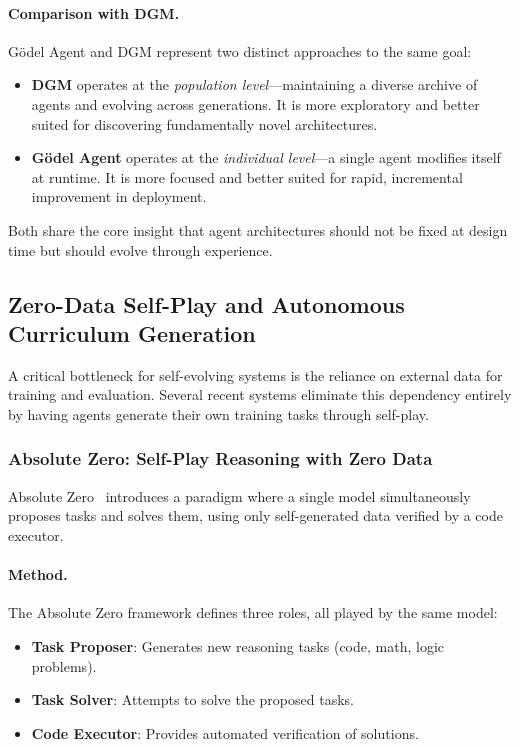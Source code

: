 \paragraph{Comparison with DGM.}
G\"odel Agent and DGM represent two distinct approaches to the same goal:
\begin{itemize}
    \item \textbf{DGM} operates at the \emph{population level}---maintaining a diverse archive of agents and evolving across generations. It is more exploratory and better suited for discovering fundamentally novel architectures.
    \item \textbf{G\"odel Agent} operates at the \emph{individual level}---a single agent modifies itself at runtime. It is more focused and better suited for rapid, incremental improvement in deployment.
\end{itemize}
Both share the core insight that agent architectures should not be fixed at design time but should evolve through experience.

\subsection{Zero-Data Self-Play and Autonomous Curriculum Generation}
\label{sec:zero-data}

A critical bottleneck for self-evolving systems is the reliance on external data for training and evaluation. Several recent systems eliminate this dependency entirely by having agents generate their own training tasks through self-play.

\subsubsection{Absolute Zero: Self-Play Reasoning with Zero Data}
\label{sec:absolute-zero}

Absolute Zero~\citep{zhao2025absolutezero} introduces a paradigm where a single model simultaneously proposes tasks and solves them, using only self-generated data verified by a code executor.

\paragraph{Method.}
The Absolute Zero framework defines three roles, all played by the same model:
\begin{itemize}
    \item \textbf{Task Proposer}: Generates new reasoning tasks (code, math, logic problems).
    \item \textbf{Task Solver}: Attempts to solve the proposed tasks.
    \item \textbf{Code Executor}: Provides automated verification of solutions.
\end{itemize}

